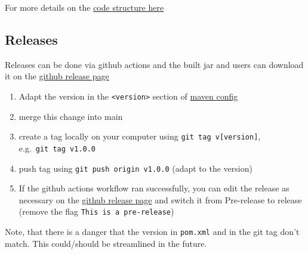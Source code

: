 
For more details on the \href{code_overview.md}{code structure here}

\subsection{Releases}\label{releases}

Releases can be done via github actions and the built jar and users can
download it on the
\href{https://github.com/ratschlab/medical-reports-deidentification/releases}{github
release page}

\begin{enumerate}
\def\labelenumi{\arabic{enumi}.}
\tightlist
\item
  Adapt the version in the \texttt{\textless{}version\textgreater{}}
  section of \href{https://github.com/ratschlab/medical-reports-deidentification/blob/main/deidentifier-pipeline/pom.xml}{maven config}
\item
  merge this change into main
\item
  create a tag locally on your computer using
  \texttt{git\ tag\ v{[}version{]}}, e.g.~\texttt{git\ tag\ v1.0.0}
\item
  push tag using \texttt{git\ push\ origin\ v1.0.0} (adapt to the
  version)
\item
  If the github actions workflow ran successfully, you can edit the
  release as necessary on the
  \href{https://github.com/ratschlab/medical-reports-deidentification/releases}{github
  release page} and switch it from Pre-release to release (remove the
  flag \texttt{This\ is\ a\ pre-release})
\end{enumerate}

Note, that there is a danger that the version in \texttt{pom.xml} and in
the git tag don't match. This could/should be streamlined in the future.
